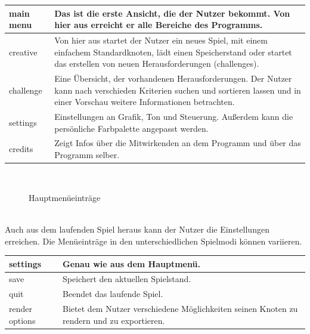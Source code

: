 	\begin{longtable}{|p{}|p{}|}
    \hline
    main menu & Das ist die erste Ansicht, die der Nutzer bekommt. Von hier aus erreicht er alle Bereiche des Programms.\\
    \hline
    creative & Von hier aus startet der Nutzer ein neues Spiel, mit einem einfachem Standardknoten, lädt einen Speicherstand oder startet das erstellen von neuen Herausforderungen (challenges).\\
    \hline
    challenge & Eine Übersicht, der vorhandenen Herausforderungen. Der Nutzer kann nach verschieden Kriterien suchen und sortieren lassen und in einer Vorschau weitere Informationen betrachten.\\
    \hline
    settings & Einstellungen an Grafik, Ton und Steuerung. Außerdem kann die persönliche Farbpalette angepasst werden.\\
    \hline
    credits & Zeigt Infos über die Mitwirkenden an dem Programm und über das Programm selber.\\
    \hline
    
   \end{longtable}
   
   ~\\
    
	\begin{figure}[h]
		\centering
	 	
	 	\caption{Hauptmenüeinträge}
	\end{figure}
	
	\clearpage
	~\\
	
	Auch aus dem laufenden Spiel heraus kann der Nutzer die Einstellungen erreichen. Die Menüeinträge in den unterschiedlichen Spielmodi können variieren.

	\begin{longtable}{|p{}|p{}|}
	
	\hline
	settings & Genau wie aus dem Hauptmenü.\\
	\hline
	save & Speichert den aktuellen Spielstand.\\
	\hline
	quit & Beendet das laufende Spiel. \\
	\hline
	render options & Bietet dem Nutzer verschiedene Möglichkeiten seinen Knoten zu rendern und zu exportieren.\\
	\hline
	
	\end{longtable}
	
